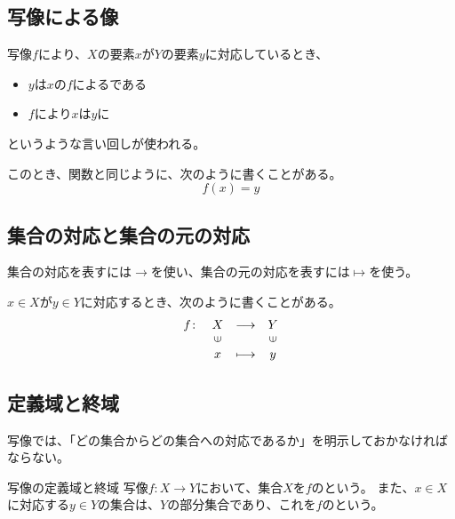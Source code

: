 \documentclass[../../../topic_linear-algebra]{subfiles}
\begin{document}
\subsection{写像による像}

写像$f$により、$X$の要素$x$が$Y$の要素$y$に対応しているとき、
\begin{itemize}
  \item $y$は$x$の$f$によるである
  \item $f$により$x$は$y$に
\end{itemize}
というような言い回しが使われる。

\br

このとき、関数と同じように、次のように書くことがある。
\begin{equation*}
  f(x) = y
\end{equation*}

\subsection{集合の対応と集合の元の対応}

集合の対応を表すには$\to$を使い、集合の元の対応を表すには$\mapsto$を使う。

\br

$x \in X$が$y \in Y$に対応するとき、次のように書くことがある。
\begin{equation*}
  \begin{array}{lclc}
    f \colon & X         & \longrightarrow & Y          \\
            & \rotatebox{90}{$\in$} &                 & \rotatebox{90}{$\in$} \\
            & x              & \longmapsto     & y
  \end{array}
\end{equation*}

\subsection{定義域と終域}

写像では、「どの集合からどの集合への対応であるか」を明示しておかなければならない。

\begin{definition}{写像の定義域と終域}
  写像$f\colon X \to Y$において、集合$X$を$f$のという。
  また、$x \in X$に対応する$y \in Y$の集合は、$Y$の部分集合であり、これを$f$のという。
\end{definition}
\end{document}

